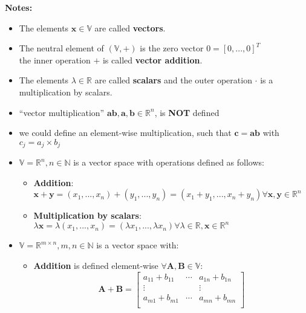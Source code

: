 \textbf{Notes:}
\begin{itemize}
    \item The elements $\mathbf{x}\in\mathbb{V}$ are called \textbf{vectors}.

    \item The neutral element of $(\mathbb{V}, +)$ is the zero vector $0 = [0, ..., 0]^T$ \\
    the inner operation $+$ is called \textbf{vector addition}.

    \item The elements $\lambda\in\mathbb{R}$ are called \textbf{scalars} and the outer operation $\cdot$ is a multiplication by scalars.

    \item “vector multiplication” $\mathbf{ab, a, b} \in \mathbb{R}^n$, is \textbf{NOT} defined

    \item we could define an element-wise multiplication, such that $\mathbf{c = ab}$ with $c_j = a_j \times b_j$

    \item $\mathbb{V} = \mathbb{R}^n, n \in \mathbb{N}$ is a vector space with operations defined as follows:
    \begin{itemize}
        \item \textbf{Addition}:\\ $\mathbf{x+y} = (x_1, ..., x_n)+(y_1, ..., y_n) = (x_1+y_1, ..., x_n+y_n) \forall \mathbf{x, y} \in \mathbb{R}^n$

        \item \textbf{Multiplication by scalars}:\\ $\lambda\mathbf{x} = \lambda(x_1, ..., x_n) = (\lambda x_1, ..., \lambda x_n) \forall \lambda \in \mathbb{R}, \mathbf{x} \in \mathbb{R}^n$
        
    \end{itemize}

    \item $\mathbb{V} = \mathbb{R}^{m\times n}, m, n \in \mathbb{N}$ is a vector space with:
    \begin{itemize}
        \item \textbf{Addition} is defined element-wise $\forall \mathbf{A, B} \in \mathbb{V}$: 
        \[
            \mathbf{A + B} = \begin{bmatrix}
                a_{11} + b_{11} & \cdots & a_{1n} + b_{1n} \\
                \vdots & & \vdots \\
                a_{m1} + b_{m1} & \cdots & a_{mn} + b_{mn} \\
            \end{bmatrix}
        \]


\end{itemize}
\end{itemize}
